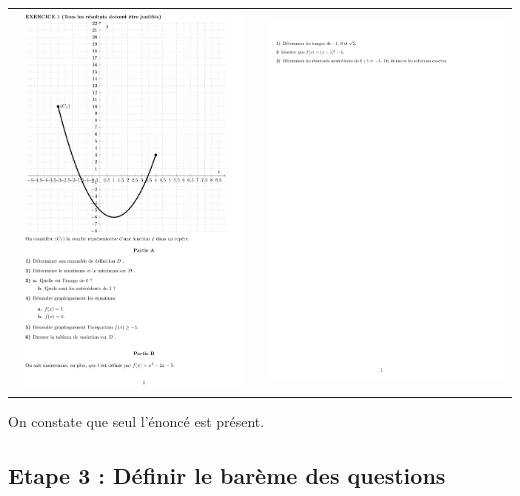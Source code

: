 \begin{dsxl}
 \begin{center}
 \begin{tabular}{cc}
 \includegraphics[width=7cm,height=10cm]{./images/creation_exercice_07.png}
&
 \includegraphics[width=7cm,height=10cm]{./images/creation_exercice_08.png}
\end{tabular}
\end{center}
On constate que seul l'énoncé est présent. 
\end{dsxl}


\subsection{Etape 3 : Définir le barème des questions}


